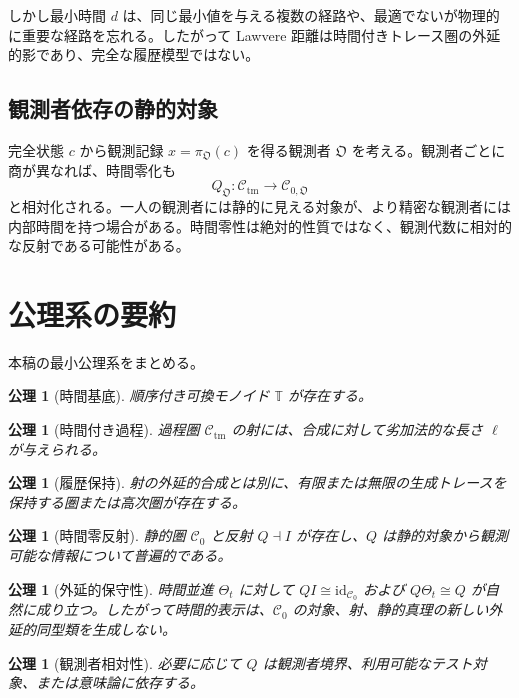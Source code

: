 \documentclass[a4paper,11pt]{ltjsarticle}
\newtheorem{axiom}[definition]{公理}
\theoremstyle{remark}
\newcommand{\C}{\mathcal C}
\newcommand{\T}{\mathbb T}
\newcommand{\id}{\mathrm{id}}
\begin{document}
しかし最小時間 $d$ は、同じ最小値を与える複数の経路や、最適でないが物理的に重要な経路を忘れる。したがって Lawvere 距離は時間付きトレース圏の外延的影であり、完全な履歴模型ではない。

\subsection{観測者依存の静的対象}
完全状態 $c$ から観測記録 $x=\pi_{\mathfrak O}(c)$ を得る観測者 $\mathfrak O$ を考える。観測者ごとに商が異なれば、時間零化も
\begin{equation}
 Q_{\mathfrak O}:\C_{\mathrm{tm}}\to\C_{0,\mathfrak O}
\end{equation}
と相対化される。一人の観測者には静的に見える対象が、より精密な観測者には内部時間を持つ場合がある。時間零性は絶対的性質ではなく、観測代数に相対的な反射である可能性がある。

\section{公理系の要約}

本稿の最小公理系をまとめる。

\begin{axiom}[時間基底]
順序付き可換モノイド $\T$ が存在する。
\end{axiom}

\begin{axiom}[時間付き過程]
過程圏 $\C_{\mathrm{tm}}$ の射には、合成に対して劣加法的な長さ $\ell$ が与えられる。
\end{axiom}

\begin{axiom}[履歴保持]
射の外延的合成とは別に、有限または無限の生成トレースを保持する圏または高次圏が存在する。
\end{axiom}

\begin{axiom}[時間零反射]
静的圏 $\C_0$ と反射 $Q\dashv I$ が存在し、$Q$ は静的対象から観測可能な情報について普遍的である。
\end{axiom}

\begin{axiom}[外延的保守性]
時間並進 $\Theta_t$ に対して $QI\cong\id_{\C_0}$ および $Q\Theta_t\cong Q$ が自然に成り立つ。したがって時間的表示は、$\C_0$ の対象、射、静的真理の新しい外延的同型類を生成しない。
\end{axiom}

\begin{axiom}[観測者相対性]
必要に応じて $Q$ は観測者境界、利用可能なテスト対象、または意味論に依存する。
\end{axiom}
\end{document}
